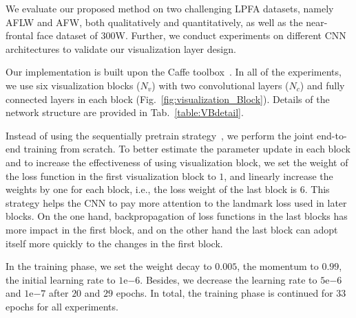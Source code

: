 \vspace{-2mm}
\label{Sec:Exp}
\vspace{-3mm}
We evaluate our proposed method on two challenging LPFA datasets, namely AFLW and AFW, both qualitatively and quantitatively, as well as the near-frontal face dataset of $300$W. 
Further, we conduct experiments on different CNN architectures to validate our visualization layer design. 

Our implementation is built upon the Caffe toolbox~\cite{jia2014caffe}. 
In all of the experiments, we use six visualization blocks ($N_v$) with two convolutional layers ($N_c$) and fully connected layers in each block (Fig.~\ref{fig:visualization_Block}). 
Details of the network structure are provided in Tab.~\ref{table:VBdetail}. 

Instead of using the sequentially pretrain strategy~\cite{yan2015hd}, we perform the joint end-to-end training from scratch. 
To better estimate the parameter update in each block and to increase the effectiveness of using visualization block, we set the weight of the loss function in the first visualization block to $1$, and linearly increase the weights by one for each block, i.e., the loss weight of the last block is $6$.
This strategy helps the CNN to pay more attention to the landmark loss used in later blocks. 
On the one hand, backpropagation of loss functions in the last blocks has more impact in the first block, and on the other hand the last block can adopt itself more quickly to the changes in the first block.  

In the training phase, we set the weight decay to $0.005$, the momentum to $0.99$, the initial learning rate to $1\mathrm{e}{-6}$. 
Besides, we decrease the learning rate to $5\mathrm{e}{-6}$ and $1\mathrm{e}{-7}$ after $20$ and $29$ epochs. 
In total, the training phase is continued for $33$ epochs for all experiments. 

